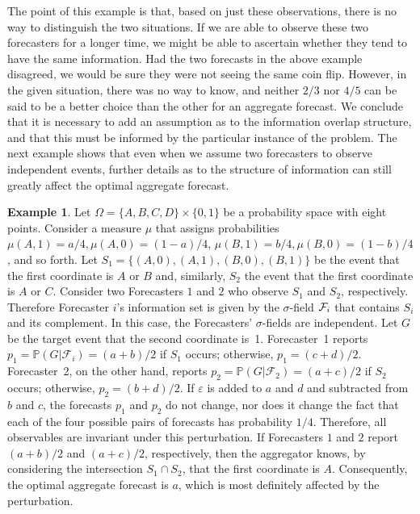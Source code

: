 \documentclass[11pt]{article}
\renewcommand{\P}{\mathbb{P}}
\theoremstyle{definition}
\newtheorem{example}[theorem]{Example}
\theoremstyle{definition}
\def\F{{\cal F}}
\def\P{{\mathbb P}}
\def\ee{\varepsilon}
\begin{document}
The point of this example is that, based on just these observations,
there is no way to distinguish the two situations.  If we are able to
observe these two forecasters for a longer time, we might be able to
ascertain whether they tend to have the same information.  Had the two
forecasts in the above example disagreed, we would be sure they were
not seeing the same coin flip.  However, in the given situation, there
was no way to know, and neither $2/3$ nor $4/5$ can be said to be a
better choice than the other for an aggregate forecast.  We conclude
that it is necessary to add an assumption as to the information
overlap structure, and that this must be informed by the particular
instance of the problem. The next example shows that even when we
assume two forecasters to observe independent events, further details
as to the structure of information can still greatly affect the
optimal aggregate forecast.

\begin{example}
Let $\Omega = \{ A,B,C,D \} \times \{ 0,1 \}$ be a probability space
with eight points.  Consider a measure $\mu$ that assigns
probabilities $\mu (A,1) = a/4, \mu (A,0) = (1-a)/4$, $\mu (B,1) =
b/4, \mu (B,0) = (1-b)/4$, and so forth. Let $S_1 = \{
(A,0),(A,1),(B,0),(B,1) \}$ be the event that the first coordinate is
$A$ or $B$ and, similarly, $S_2$ the event that the first coordinate
is $A$ or $C$. Consider two Forecasters $1$ and $2$ who observe $S_1$
and $S_2$, respectively. Therefore Forecaster $i$'s information set is
given by the $\sigma$-field $\F_i$ that contains $S_i$ and its
complement. In this case, the Forecasters' $\sigma$-fields are independent. Let
$G$ be the target event that the second coordinate is~1.  Forecaster~1
reports $p_1 = \P(G | \mathcal{F}_i) = (a+b)/2$ if $S_1$ occurs;
otherwise, $p_1 = (c+d)/2$.  Forecaster~2, on the other hand, reports
$p_2 = \P(G | \mathcal{F}_2) = (a+c)/2$ if $S_2$ occurs; otherwise,
$p_2 = (b+d)/2$.  If $\ee$ is added to $a$ and $d$ and subtracted from
$b$ and $c$, the forecasts $p_1$ and $p_2$ do not change, nor does it
change the fact that each of the four possible pairs of forecasts has
probability $1/4$.  Therefore, all observables are invariant under
this perturbation.  If Forecasters $1$ and $2$ report $(a+b)/2$ and
$(a+c)/2$, respectively, then the aggregator knows, by considering the
intersection $S_1 \cap S_2$, that the first coordinate is $A$.
Consequently, the optimal aggregate forecast is $a$, which is most
definitely affected by the perturbation.
\end{example}
\end{document}
